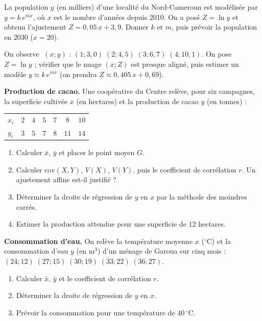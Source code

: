 
\exo{} La population $y$ (en milliers) d'une localité du Nord-Cameroun est modélisée
par $y=k\,e^{mx}$, où $x$ est le nombre d'années depuis 2010. On a posé $Z=\ln y$ et obtenu
l'ajustement $Z=0{,}05\,x+3{,}9$. Donner $k$ et $m$, puis prévoir la population en 2030
($x=20$).

\exo{} On observe $\;(x;y)$ : $(1;3{,}0)\;(2;4{,}5)\;(3;6{,}7)\;(4;10{,}1)$. On pose
$Z=\ln y$ ; vérifier que le nuage $(x;Z)$ est presque aligné, puis estimer un modèle
$y\approx k\,e^{mx}$ (on prendra $Z\approx0{,}405\,x+0{,}69$).


\exo{} \textbf{Production de cacao.} Une coopérative du Centre relève, pour six
campagnes, la superficie cultivée $x$ (en hectares) et la production de cacao $y$ (en tonnes) :
\begin{center}\small
\begin{tabular}{@{}lcccccc@{}}
\toprule
$x_i$ & $2$ & $4$ & $5$ & $7$ & $8$ & $10$\\
$y_i$ & $3$ & $5$ & $7$ & $8$ & $11$ & $14$\\
\bottomrule
\end{tabular}
\end{center}
\begin{enumerate}[label=\arabic*)]
\item Calculer $\bar x$, $\bar y$ et placer le point moyen $G$.
\item Calculer $\mathrm{cov}(X,Y)$, $V(X)$, $V(Y)$, puis le coefficient de corrélation $r$.
Un ajustement affine est-il justifié ?
\item Déterminer la droite de régression de $y$ en $x$ par la méthode des moindres carrés.
\item Estimer la production attendue pour une superficie de $12$ hectares.
\end{enumerate}

\exo{} \textbf{Consommation d'eau.} On relève la température moyenne $x$ ($^\circ$C) et
la consommation d'eau $y$ (en $\mathrm{m}^3$) d'un ménage de Garoua sur cinq mois :
$(24;12)\;(27;15)\;(30;19)\;(33;22)\;(36;27)$.
\begin{enumerate}[label=\arabic*)]
\item Calculer $\bar x$, $\bar y$ et le coefficient de corrélation $r$.
\item Déterminer la droite de régression de $y$ en $x$.
\item Prévoir la consommation pour une température de $40\,^\circ$C.
\end{enumerate}


